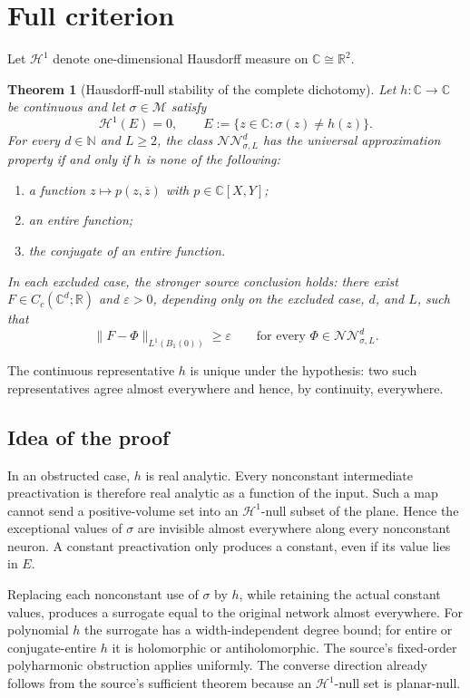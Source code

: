 \documentclass[11pt]{article}
\newtheorem{theorem}{Theorem}
\theoremstyle{remark}
\newcommand{\C}{\mathbb C}
\newcommand{\R}{\mathbb R}
\newcommand{\N}{\mathbb N}
\newcommand{\M}{\mathcal M}
\newcommand{\NN}{\mathcal{NN}}
\newcommand{\HH}{\mathcal H}
\begin{document}
\section{Full criterion}

Let $\HH^1$ denote one-dimensional Hausdorff measure on $\C\cong\R^2$.

\begin{theorem}[Hausdorff-null stability of the complete dichotomy]
\label{thm:main}
Let $h:\C\to\C$ be continuous and let $\sigma\in\M$ satisfy
\[
  \HH^1(E)=0,
  \qquad E:=\{z\in\C:\sigma(z)\ne h(z)\}.
\]
For every $d\in\N$ and $L\ge2$, the class $\NN^d_{\sigma,L}$ has the
universal approximation property if and only if $h$ is none of the following:
\begin{enumerate}[label=(\roman*),leftmargin=2em]
\item a function $z\mapsto p(z,\overline z)$ with $p\in\C[X,Y]$;
\item an entire function;
\item the conjugate of an entire function.
\end{enumerate}

In each excluded case, the stronger source conclusion holds: there exist
$F\in C_c(\C^d;\R)$ and $\varepsilon>0$, depending only on the excluded
case, $d$, and $L$, such that
\[
 \|F-\Phi\|_{L^1(B_1(0))}\ge\varepsilon
 \qquad\text{for every }\Phi\in\NN^d_{\sigma,L}.
\]
\end{theorem}

The continuous representative $h$ is unique under the hypothesis: two such
representatives agree almost everywhere and hence, by continuity, everywhere.

\subsection*{Idea of the proof}

In an obstructed case, $h$ is real analytic.  Every nonconstant intermediate
preactivation is therefore real analytic as a function of the input.  Such a
map cannot send a positive-volume set into an $\HH^1$-null subset of the
plane.  Hence the exceptional values of $\sigma$ are invisible almost
everywhere along every nonconstant neuron.  A constant preactivation only
produces a constant, even if its value lies in $E$.

Replacing each nonconstant use of $\sigma$ by $h$, while retaining the actual
constant values, produces a surrogate equal to the original network almost
everywhere.  For polynomial $h$ the surrogate has a width-independent degree
bound; for entire or conjugate-entire $h$ it is holomorphic or
antiholomorphic.  The source's fixed-order polyharmonic obstruction applies
uniformly.  The converse direction already follows from the source's
sufficient theorem because an $\HH^1$-null set is planar-null.
\end{document}
